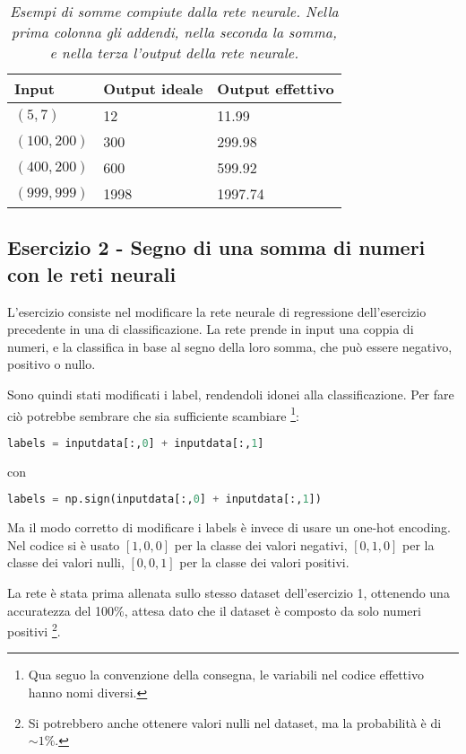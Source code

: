\documentclass{article}
\begin{document}
\begin{table}[H]
    \centering
    \begin{tabular}{lll}
    \toprule
     \textbf{Input}&\textbf{Output ideale}&\textbf{Output effettivo} \\
     \midrule
     $(5,7)$ & 12 & 11.99 \\
     $(100,200)$ & 300 & 299.98 \\
     $(400,200)$ & 600 & 599.92 \\
     $(999,999)$ & 1998 & 1997.74 \\
     \bottomrule
    \end{tabular}
    \caption{\textit{Esempi di somme compiute dalla rete neurale. Nella prima colonna gli addendi, nella seconda la somma, e nella terza l'output della rete neurale.}}
    \label{tab:esempi}
\end{table}



\subsection*{Esercizio 2 - Segno di una somma di numeri con le reti neurali }
L'esercizio consiste nel modificare la rete neurale di regressione dell'esercizio precedente in una di classificazione.
La rete prende in input una coppia di numeri, e la classifica in base al segno della loro somma, che può essere negativo, positivo o nullo.

Sono quindi stati modificati i label, rendendoli idonei alla classificazione.
Per fare ciò potrebbe sembrare che sia sufficiente scambiare \footnote{Qua seguo la convenzione della consegna, le variabili nel codice effettivo hanno nomi diversi.}:

\begin{lstlisting}[language = Python]
    labels = inputdata[:,0] + inputdata[:,1]
\end{lstlisting}

con 

\begin{lstlisting}[language = Python]
    labels = np.sign(inputdata[:,0] + inputdata[:,1])
\end{lstlisting}

Ma il modo corretto di modificare i labels è invece di usare un one-hot encoding. Nel codice si è usato $[1,0,0]$ per la classe dei valori negativi, $[0,1,0]$ per la classe dei valori nulli, $[0,0,1]$ per la classe dei valori positivi.

La rete è stata prima allenata sullo stesso dataset dell'esercizio 1, ottenendo una accuratezza del 100\%, attesa dato che il dataset è composto da solo numeri positivi \footnote{Si potrebbero anche ottenere valori nulli nel dataset, ma la probabilità è di $\sim 1\%$.}.
\end{document}
